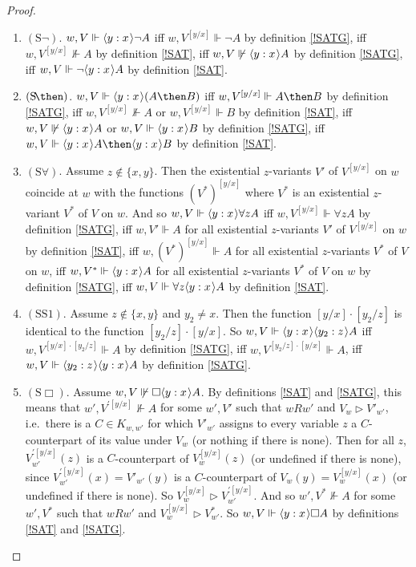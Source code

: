 \documentclass[11pt]{woarticle}
\theoremstyle{break}
\theoremstyle{nonumberplain}
\newcommand{\SAT}{\Vdash}
\newcommand{\Img}{\triangleright}
\newcommand{\1}{\;\,|\;\,}
\renewcommand{\t}[1]{\ensuremath{\langle #1  \makebox[.2ex]{}\rangle}}
\newcommand{\T}[1]{\ensuremath{(\mathrm{ #1})}}
\begin{document}
\begin{proof}
  \quad

  \begin{enumerate}
  \item \T{S\neg}.\; $w,V \SAT \t{y:x}\neg A$ iff $w,V^{[y/x]} \SAT
    \neg A$ by definition \ref{!SATG}, iff $w,V^{[y/x]} \not\SAT A$ by
    definition \ref{!SAT}, iff $w,V \not\SAT \t{y:x}A$ by definition
    \ref{!SATG}, iff $w,V \SAT \neg\t{y:x}A$ by definition \ref{!SAT}.

  \item \T{S\!\then}.\; $w,V \SAT \t{y:x}(A\then B)$ iff $w,V^{[y/x]}
    \SAT A\then B$ by definition \ref{!SATG}, iff $w,V^{[y/x]}
    \not\SAT A$ or $w,V^{[y/x]} \SAT B$ by definition \ref{!SAT}, iff
    $w,V \not\SAT \t{y:x}A$ or $w,V \SAT \t{y:x}B$ by definition
    \ref{!SATG}, iff $w,V \SAT \t{y:x}A \then \t{y:x}B$ by definition
    \ref{!SAT}.

  \item \T{S\forall}.\; Assume $z \not\in \{x,y\}$. Then the
    existential $z$-variants $V'$ of $V^{[y/x]}$ on $w$ coincide at
    $w$ with the functions $(V^*)^{[y/x]}$ where $V^*$ is an
    existential $z$-variant $V^*$ of $V$ on $w$. And so $w,V \SAT
    \t{y:x}\forall z A$ iff $w,V^{[y/x]} \SAT \forall z A$ by
    definition \ref{!SATG}, iff $w,V' \SAT A$ for all existential
    $z$-variants $V'$ of $V^{[y/x]}$ on $w$ by definition \ref{!SAT},
    iff $w,(V^*)^{[y/x]} \SAT A$ for all existential $z$-variants
    $V^*$ of $V$ on $w$, iff $w,V^* \SAT \t{y:x} A$ for all
    existential $z$-variants $V^*$ of $V$ on $w$ by definition
    \ref{!SATG}, iff $w,V \SAT \forall z \t{y:x} A$ by definition
    \ref{!SAT}. 

  \item \T{SS1}.\; Assume $z \not\in \{x,y\}$ and $y_2\not=x$. Then
    the function $[y/x]\cdot [y_2/z]$ is identical to the function
    $[y_2/z]\cdot [y/x]$. So $w,V \SAT \t{y:x}\t{y_2:z} A$ iff
    $w,V^{[y/x] \cdot [y_2/z]} \SAT A$ by definition \ref{!SATG}, iff
    $w,V^{[y_2/z]\cdot [y/x]} \SAT A$, iff $w,V \SAT
    \t{y_2:z} \t{y:x} A$ by definition \ref{!SATG}.

  \item \T{S\Box}.\; Assume $w,V \not\SAT \Box \t{y:x} A$.  By
    definitions \ref{!SAT} and \ref{!SATG}, this means that
    $w',V^{\prime [y/x]} \not\SAT A$ for some $w',V'$ such that $wRw'$
    and $V_w\Img V'_{w'}$, i.e.\ there is a $C\in K_{w,w'}$ for which
    $V'_{w'}$ assigns to every variable $z$ a $C$-counterpart of its
    value under $V_w$ (or nothing if there is none). Then for all $z$,
    $V^{\prime[y/x]}_{w'}(z)$ is a $C$-counterpart of $V^{[y/x]}_w(z)$
    (or undefined if there is none), since $V^{\prime [y/x]}_{w'}(x) =
    V'_{w'}(y)$ is a $C$-counterpart of $V_w(y) = V^{[y/x]}_w(x)$ (or
    undefined if there is none). So $V^{[y/x]}_w\Img V_{w'}^{\prime
      [y/x]}$. And so $w',V^* \not\SAT A$ for some $w',V^*$ such that
    $wRw'$ and $V^{[y/x]}_w \Img V^*_{w'}$. So $w,V \SAT \t{y:x}\Box
    A$ by definitions \ref{!SAT} and \ref{!SATG}.


\end{enumerate}
\end{proof}
\end{document}
